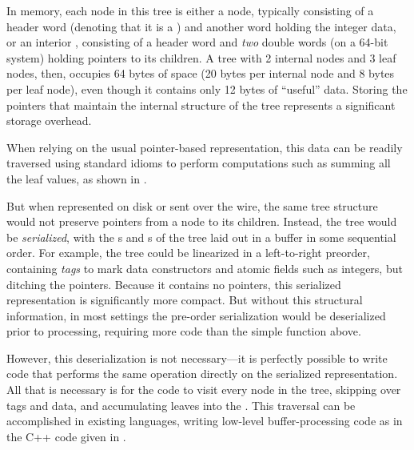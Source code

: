 In memory, each node in this tree is either a  node, typically
consisting of a header word (denoting that it is a ) and another word
holding the integer data, or an interior , consisting of a header word
and {\em two} double words (on a 64-bit system) holding pointers to its
children. A tree with 2 internal nodes and 3 leaf nodes, then, occupies 64 bytes
of space (20 bytes per internal node and 8 bytes per leaf node), even though it
contains only 12 bytes of ``useful'' data.  Storing the pointers that maintain
the internal structure of the tree represents a significant storage overhead.


When relying on the usual pointer-based representation, this data
can be readily traversed using standard idioms to perform computations such as summing all the leaf values, as shown in .



But when represented on disk or sent over the wire, the same tree structure
would not preserve pointers from a node to its children. Instead, the tree
would be {\em serialized}, with the s and s of the tree laid
out in a buffer in some sequential order. For example, the tree could be
linearized in a left-to-right preorder, containing {\em tags} to mark data
constructors and atomic fields such as integers, but ditching the pointers.
Because it contains no pointers, this serialized representation is
significantly more compact.
%
But without this structural information, in most settings the
pre-order serialization would be deserialized prior to processing,
requiring more code than the simple  function above.

However, this deserialization
is not necessary---it is perfectly possible to write code that performs
the same  operation directly on the serialized representation.
All that is necessary is for the code to visit every node in the tree, skipping over
tags and  data, and accumulating leaves into the .
%
This traversal can be accomplished in existing languages, writing low-level
buffer-processing code as in the C++ code given in .

